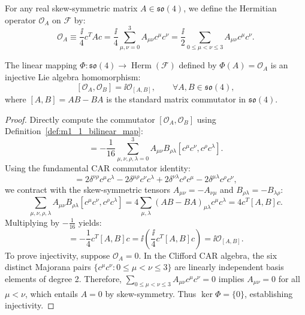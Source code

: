 \begin{definition}
\label{def:m1_1_bilinear_map}
For any real skew-symmetric matrix $A \in \mathfrak{so}(4)$, we define the Hermitian operator $\mathcal{O}_A$ on $\mathcal{F}$ by:
\begin{equation}
\label{eq:m1_1_bilinear_def}
\mathcal{O}_A \equiv \frac{\ii}{4} c^T A c = \frac{\ii}{4}\sum_{\mu, \nu=0}^3 A_{\mu\nu} c^\mu c^\nu = \frac{\ii}{2} \sum_{0 \le \mu < \nu \le 3} A_{\mu\nu} c^\mu c^\nu.
\end{equation}
\end{definition}

\begin{theorem}
\label{thm:m1_1_lie_homomorphism}
The linear mapping $\Phi: \mathfrak{so}(4) \to \operatorname{Herm}(\mathcal{F})$ defined by $\Phi(A) = \mathcal{O}_A$ is an injective Lie algebra homomorphism:
\begin{equation}
\label{eq:m1_1_lie_homomorphism}
[\mathcal{O}_A, \mathcal{O}_B] = \ii \mathcal{O}_{[A, B]}, \qquad \forall A, B \in \mathfrak{so}(4),
\end{equation}
where $[A, B] = AB - BA$ is the standard matrix commutator in $\mathfrak{so}(4)$.
\end{theorem}
\begin{proof}
Directly compute the commutator $[\mathcal{O}_A, \mathcal{O}_B]$ using Definition~\ref{def:m1_1_bilinear_map}:
\begin{equation}
[\mathcal{O}_A, \mathcal{O}_B] = -\frac{1}{16}\sum_{\mu,\nu,\rho,\lambda=0}^3 A_{\mu\nu} B_{\rho\lambda} [c^\mu c^\nu, c^\rho c^\lambda].
\end{equation}
Using the fundamental CAR commutator identity:
\begin{equation}
[c^\mu c^\nu, c^\rho c^\lambda] = 2\delta^{\nu\rho} c^\mu c^\lambda - 2\delta^{\mu\rho} c^\nu c^\lambda + 2\delta^{\nu\lambda} c^\rho c^\mu - 2\delta^{\mu\lambda} c^\rho c^\nu,
\end{equation}
we contract with the skew-symmetric tensors $A_{\mu\nu} = -A_{\nu\mu}$ and $B_{\rho\lambda} = -B_{\lambda\rho}$:
\begin{equation}
\sum_{\mu,\nu,\rho,\lambda} A_{\mu\nu} B_{\rho\lambda} [c^\mu c^\nu, c^\rho c^\lambda] = 4 \sum_{\mu,\lambda} (AB - BA)_{\mu\lambda} c^\mu c^\lambda = 4 c^T [A, B] c.
\end{equation}
Multiplying by $-\frac{1}{16}$ yields:
\begin{equation}
[\mathcal{O}_A, \mathcal{O}_B] = -\frac{1}{4} c^T [A, B] c = \ii \left( \frac{\ii}{4} c^T [A, B] c \right) = \ii \mathcal{O}_{[A, B]}.
\end{equation}
To prove injectivity, suppose $\mathcal{O}_A = 0$. In the Clifford CAR algebra, the six distinct Majorana pairs $\{c^\mu c^\nu : 0 \le \mu < \nu \le 3\}$ are linearly independent basis elements of degree 2. Therefore, $\sum_{0 \le \mu < \nu \le 3} A_{\mu\nu} c^\mu c^\nu = 0$ implies $A_{\mu\nu} = 0$ for all $\mu < \nu$, which entails $A = 0$ by skew-symmetry. Thus $\ker \Phi = \{0\}$, establishing injectivity.
\end{proof}

